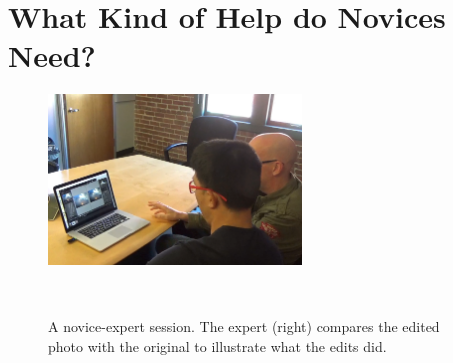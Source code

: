 \section{What Kind of Help do Novices Need?}
\begin{figure}[b!]
\centering
  \includegraphics[width=0.6\textwidth]{discoveryspace/figures/obs.png}
  \caption{A novice-expert session. The expert (right) compares the edited photo with the original to illustrate what the edits did.}~\label{fig:discoveryspace_obs}
\end{figure}

